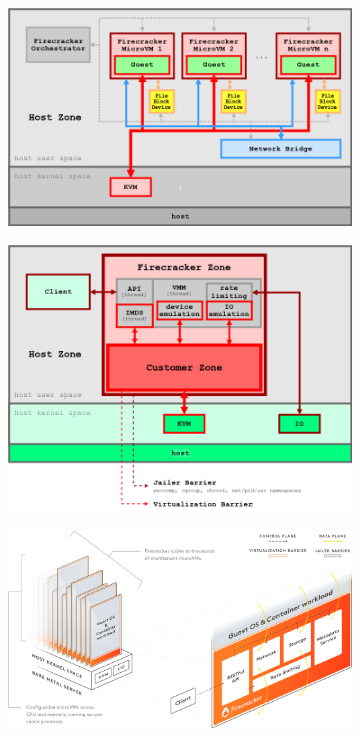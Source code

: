 \documentclass[11pt]{article}
\begin{document}
\begin{figure}[!htbp]
	\begin{subfigure}[a]{0.49\linewidth}
		\includegraphics[width=\linewidth,height=0.27\textheight]{figs/firecracker_host_integration}
		\caption{}
		\label{figs:host}
	\end{subfigure}
	\begin{subfigure}[a]{0.49\linewidth}
		\includegraphics[width=\linewidth]{figs/firecracker_threat_containment}
		\caption{}
		\label{figs:internal}
	\end{subfigure}
	\begin{subfigure}[b]{\linewidth}
		\centering
		\includegraphics[width=0.8\linewidth]{figs/firecracker}
		\caption{}
		\label{figs:fire}
	\end{subfigure}
	\caption{}
	\label{figs:Firecracker}
\end{figure}
\end{document}
